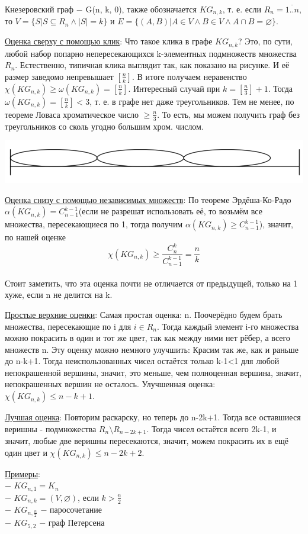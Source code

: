 \Def Кнезеровский граф $-$ G(n, k, 0), также обозначается $KG_{n, k}$, т. е. если $R_n=\overline{1..n}$, то $V=\{ S | S \subseteq R_n\!\! \wedge\!\! |S| = k \}$ и $E=\{ (A, B) | A \in V\!\! \wedge\!\! B \in V\!\! \wedge\!\! A\! \cap\! B = \varnothing \}$.

\underline{Оценка сверху с помощью клик}: Что такое клика в графе $KG_{n,k}$? Это, по сути, любой набор попарно непересекающихся k-элементных подмножеств множества $R_n$. Естественно, типичная клика выглядит так, как показано на рисунке. И её размер заведомо непревышает $\left[ \frac{n}{k} \right]$. В итоге получаем неравенство $\chi(KG_{n, k}) \geqslant \omega(KG_{n, k}) = \left[\frac{n}{k} \right]$. Интересный случай при $k=\left[ \frac{n}{3} \right] + 1$. Тогда $\omega(KG_{n, k}) = \left[ \frac{n}{k} \right] < 3$, т. е. в графе нет даже треугольников. Тем не менее, по теореме Ловаса хроматическое число $\geqslant \frac{n}{3}$. То есть, мы можем получить граф без треугольников со сколь угодно большим хром. числом.

\begin{center}
    \includegraphics[scale=0.4]{images/Knezer_clique.png}
\end{center}

\underline{Оценка снизу с помощью независимых множеств}: По теореме Эрдёша-Ко-Радо \newline
$\alpha(KG_{n, k})=C^{k-1}_{n-1}$(если не разрешат использовать её, то возьмём все множества, пересекающиеся по 1, тогда получим $\alpha(KG_{n, k}) \geqslant C^{k-1}_{n-1}$), значит, по нашей оценке 
$$\chi(KG_{n, k}) \geqslant \frac{C^k_n}{C^{k-1}_{n-1}} = \frac{n}{k}$$ \\
Стоит заметить, что эта оценка почти не отличается от предыдущей, только на 1 хуже, если n не делится на k.

\underline{Простые верхние оценки}: Самая простая оценка: n. Поочерёдно будем брать множества, пересекающие по i для $i \in R_n$. Тогда каждый элемент i-го множества можно покрасить в один и тот же цвет, так как между ними нет рёбер, а всего множеств n. Эту оценку можно немного улучшить: Красим так же, как и раньше до n-k+1. Тогда неиспользованных чисел остаётся только k-1<1 для любой непокрашенной вершины, значит, это меньше, чем полноценная вершина, значит, непокрашенных вершин не осталось. Улучшенная оценка: $\chi(KG_{n, k}) \leqslant n-k+1$.

\underline{Лучшая оценка}: Повторим раскарску, но теперь до n-2k+1. Тогда все оставшиеся веришны - подмножества $R_n \setminus R_{n-2k+1}$. Тогда чисел остаётся всего 2k-1, и значит, любые две веришны пересекаются, значит, можем покрасить их в ещё один цвет и $\chi(KG_{n, k}) \leqslant n-2k+2$.

\underline{Примеры}: \\
$-$ $KG_{n, 1}=K_n$ \\
$-$ $KG_{n, k}=(V, \varnothing)$, если $k > \frac{n}{2}$ \\ 
$-$ $KG_{n, \frac{n}{2}}$ $-$ паросочетание \\
$-$ $KG_{5, 2}$ $-$ граф Петерсена
